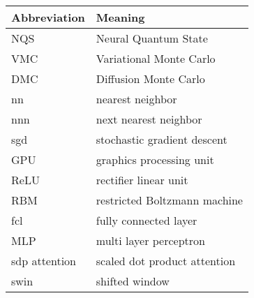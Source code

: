 \noindent\\\\

\begin{tabular}[h]{p{3cm}|l}
	Abbreviation & Meaning\\
	\hline
	NQS & Neural Quantum State\\
	VMC & Variational Monte Carlo\\
	DMC & Diffusion Monte Carlo\\
	nn & nearest neighbor\\
	nnn & next nearest neighbor\\
	sgd & stochastic gradient descent\\
	GPU & graphics processing unit\\
	ReLU & rectifier linear unit\\
	RBM & restricted Boltzmann machine\\
	fcl & fully connected layer\\
	MLP & multi layer perceptron\\
	sdp attention & scaled dot product attention\\
	swin & shifted window\\
\end{tabular}
\newpage